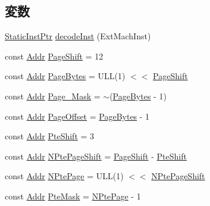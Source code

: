 \subsection*{変数}
\begin{DoxyCompactItemize}
\item 
\hyperlink{classRefCountingPtr}{StaticInstPtr} \hyperlink{namespacePowerISA_acff056b9dfcd05748ff37c6a69d9e854}{decodeInst} (ExtMachInst)
\item 
const \hyperlink{base_2types_8hh_af1bb03d6a4ee096394a6749f0a169232}{Addr} \hyperlink{namespacePowerISA_a6eacddc1d6d191380d9afdac5920ea48}{PageShift} = 12
\item 
const \hyperlink{base_2types_8hh_af1bb03d6a4ee096394a6749f0a169232}{Addr} \hyperlink{namespacePowerISA_ad9d6a4d965e107c9a7214f096107296b}{PageBytes} = ULL(1) $<$$<$ \hyperlink{namespacePowerISA_a6eacddc1d6d191380d9afdac5920ea48}{PageShift}
\item 
const \hyperlink{base_2types_8hh_af1bb03d6a4ee096394a6749f0a169232}{Addr} \hyperlink{namespacePowerISA_ac2d47d845cf48dbc176f717bb7d50a7f}{Page\_\-Mask} = $\sim$(\hyperlink{namespacePowerISA_ad9d6a4d965e107c9a7214f096107296b}{PageBytes} -\/ 1)
\item 
const \hyperlink{base_2types_8hh_af1bb03d6a4ee096394a6749f0a169232}{Addr} \hyperlink{namespacePowerISA_a51e1064f1269394dc26702651be5061f}{PageOffset} = \hyperlink{namespacePowerISA_ad9d6a4d965e107c9a7214f096107296b}{PageBytes} -\/ 1
\item 
const \hyperlink{base_2types_8hh_af1bb03d6a4ee096394a6749f0a169232}{Addr} \hyperlink{namespacePowerISA_af2c06ba3a5eb15cdac25d21b735b7161}{PteShift} = 3
\item 
const \hyperlink{base_2types_8hh_af1bb03d6a4ee096394a6749f0a169232}{Addr} \hyperlink{namespacePowerISA_a9f060ccda225dfb28dff712695adab46}{NPtePageShift} = \hyperlink{namespacePowerISA_a6eacddc1d6d191380d9afdac5920ea48}{PageShift} -\/ \hyperlink{namespacePowerISA_af2c06ba3a5eb15cdac25d21b735b7161}{PteShift}
\item 
const \hyperlink{base_2types_8hh_af1bb03d6a4ee096394a6749f0a169232}{Addr} \hyperlink{namespacePowerISA_ae295358052b4e754e08cd5cd763c212a}{NPtePage} = ULL(1) $<$$<$ \hyperlink{namespacePowerISA_a9f060ccda225dfb28dff712695adab46}{NPtePageShift}
\item 
const \hyperlink{base_2types_8hh_af1bb03d6a4ee096394a6749f0a169232}{Addr} \hyperlink{namespacePowerISA_a11ac2316fa90081132b648e36e4dd11b}{PteMask} = \hyperlink{namespacePowerISA_ae295358052b4e754e08cd5cd763c212a}{NPtePage} -\/ 1

\end{DoxyCompactItemize}
